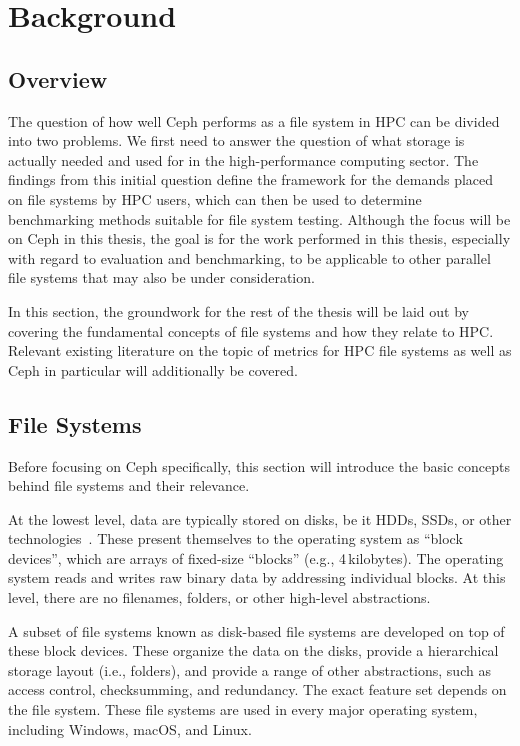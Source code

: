 \newpage
\section{Background}
\label{sec:background}

\subsection{Overview}

The question of how well Ceph performs as a file system in \ac{HPC} can be divided into two problems. We first need to answer the question of what storage is actually needed and used for in the high-performance computing sector. The findings from this initial question define the framework for the demands placed on file systems by \ac{HPC} users, which can then be used to determine benchmarking methods suitable for file system testing. Although the focus will be on Ceph in this thesis, the goal is for the work performed in this thesis, especially with regard to evaluation and benchmarking, to be applicable to other parallel file systems that may also be under consideration.

In this section, the groundwork for the rest of the thesis will be laid out by covering the fundamental concepts of file systems and how they relate to \ac{HPC}. Relevant existing literature on the topic of metrics for \ac{HPC} file systems as well as Ceph in particular will additionally be covered. 

\subsection{File Systems}

Before focusing on Ceph specifically, this section will introduce the basic concepts behind file systems and their relevance.

At the lowest level, data are typically stored on disks, be it \acp{HDD}, \acp{SSD}, or other technologies~\cite[ch.~4]{modern-operating-systems-book}. These present themselves to the operating system as \enquote{block devices}, which are arrays of fixed-size \enquote{blocks} (e.g., 4\,kilobytes). The operating system reads and writes raw binary data by addressing individual blocks. At this level, there are no filenames, folders, or other high-level abstractions.

A subset of file systems known as disk-based file systems are developed on top of these block devices. These organize the data on the disks, provide a hierarchical storage layout (i.e., folders), and provide a range of other abstractions, such as access control, checksumming, and redundancy. The exact feature set depends on the file system. These file systems are used in every major operating system, including Windows, macOS, and Linux.

